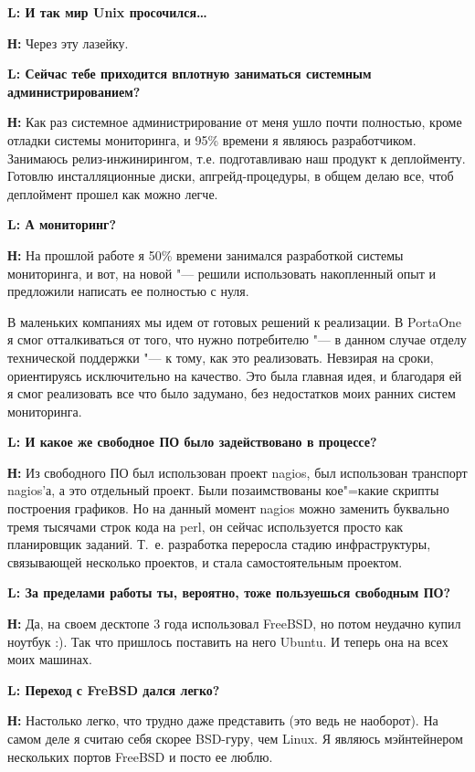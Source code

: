 \documentclass[10pt, a5paper]{article}
\begin{document}
{\noindent \bf L: И так мир Unix просочился\ldots}

{\noindent \bf Н:} Через эту лазейку.

{\noindent \bf L: Сейчас тебе приходится вплотную заниматься системным администрированием?}

{\noindent \bf Н:} Как раз системное администрирование от меня ушло почти полностью, кроме отладки системы мониторинга, и 95\% времени я являюсь разработчиком. Занимаюсь релиз-инжинирингом, т.е. подготавливаю наш продукт к деплойменту. Готовлю инсталляционные диски, апгрейд-процедуры, в общем делаю все, чтоб деплоймент прошел как можно легче. 

{\noindent \bf L: А мониторинг?}

{\noindent \bf Н:} На прошлой работе я 50\% времени занимался разработкой системы мониторинга, и вот, на новой "--- решили использовать накопленный опыт и предложили написать ее полностью с нуля.

В маленьких компаниях мы идем от готовых решений к реализации. В PortaOne я смог отталкиваться от того, что нужно потребителю "--- в данном случае отделу технической поддержки "--- к тому, как это реализовать. Невзирая на сроки, ориентируясь исключительно на качество. Это была главная идея, и благодаря ей я смог реализовать все что было задумано, без недостатков моих ранних систем мониторинга.

{\noindent \bf L: И какое же свободное ПО было задействовано в процессе?}

{\noindent \bf Н:} Из свободного ПО был использован проект nagios, был использован транспорт nagios'а, а это отдельный проект. Были позаимствованы кое"=какие скрипты построения графиков. Но на данный момент nagios можно заменить буквально тремя тысячами строк кода на perl, он сейчас используется просто как планировщик заданий. Т.~е. разработка переросла стадию инфраструктуры, связывающей несколько проектов, и стала самостоятельным проектом.

{\noindent \bf L: За пределами работы ты, вероятно, тоже пользуешься свободным ПО?}

{\noindent \bf Н:} Да, на своем десктопе 3 года использовал FreeBSD, но потом неудачно купил ноутбук :). Так что пришлось поставить на него Ubuntu. И теперь она на всех моих машинах.

{\noindent \bf L: Переход с FreBSD дался легко?}

{\noindent \bf Н:} Настолько легко, что трудно даже представить (это ведь не наоборот). На самом деле я считаю себя скорее BSD-гуру, чем Linux. Я являюсь мэйнтейнером нескольких портов FreeBSD и посто ее люблю.
\end{document}
